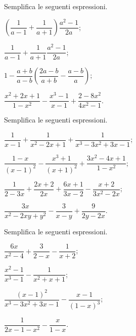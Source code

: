 \begin{esercizio}[\Ast]
\label{ese:14.32}
Semplifica le seguenti espressioni.
\begin{multicols}{2}
\begin{enumeratea}
 \item $\left(\dfrac{1}{a-1}+\dfrac{1}{a+1}\right)\dfrac{a^{2}-1}{2a}$;
 \item $\dfrac{1}{a-1}+\dfrac{1}{a+1}\dfrac{a^{2}-1}{2a}$;
 \item $1-\dfrac{a+b}{a-b} \left(\dfrac{2a-b}{a+b}-\dfrac{a-b}{a}\right)$;
 \item $\dfrac{x^{2}+2x+1}{1-x^{2}}-\dfrac{x^{3}-1}{x-1}+\dfrac{2-8x^{2}}{4x^{2}-1}$.
\end{enumeratea}
\end{multicols}
\end{esercizio}

\begin{esercizio}[\Ast]
\label{ese:14.33}
Semplifica le seguenti espressioni.
\begin{multicols}{2}
\begin{enumeratea}
 \item $\dfrac{1}{x-1}+\dfrac{1}{x^{2}-2x+1}+\dfrac{1}{x^{3}-3x^{2}+3x-1}$;
 \item $\dfrac{1-x}{(x-1)^{2}}-\dfrac{x^{3}+1}{(x+1)^{2}}+\dfrac{3x^{2}-4x+1}{1-x^{2}}$;
 \item $\dfrac{1}{2-3x}+\dfrac{2x+2}{2x}+\dfrac{6x+1}{3x-2}-\dfrac{x+2}{3x^{2}-2x}$;
 \item $\dfrac{3x}{x^{2}-2xy+y^{2}}-\dfrac{3}{x-y}+\dfrac{9}{2y-2x}$.
\end{enumeratea}
\end{multicols}
\end{esercizio}

\begin{esercizio}[\Ast]
\label{ese:14.34}
Semplifica le seguenti espressioni.
\begin{multicols}{2}
\begin{enumeratea}
 \item $\dfrac{6x}{x^{2}-4}+\dfrac{3}{2-x}-\dfrac{1}{x+2}$;
 \item $\dfrac{x^{2}-1}{x^{3}-1}-\dfrac{1}{x^{2}+x+1}$;
 \item $\dfrac{(x-1)^{2}}{x^{3}-3x^{2}+3x-1}-\dfrac{x-1}{(1-x)^{3}}$;
 \item $\dfrac{1}{2x-1-x^{2}}-\dfrac{x}{1-x}$.
\end{enumeratea}
\end{multicols}
\end{esercizio}
\pagebreak

